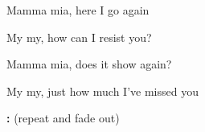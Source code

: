 \begin{song}
\bigskip

Mamma mia, here I go again \par
{} My  my, how can I resist you? \par
{}Mamma mia, does it show again? \par
{} My  my, just how much I've missed you \par

\bigskip

\Bridge

\bigskip

\Outro\textbf{:}     (repeat and fade out) \par

\end{song}
